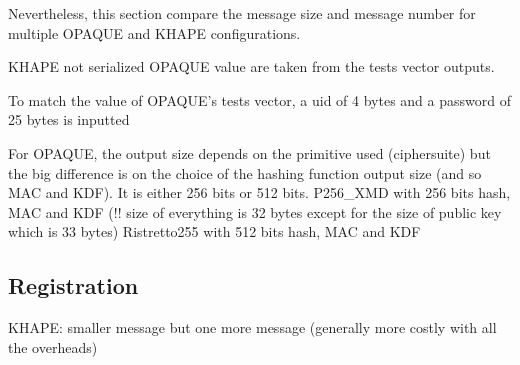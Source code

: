 \documentclass[../report.tex]{subfiles}
\begin{document}
Nevertheless, this section compare the message size and message number for multiple OPAQUE and KHAPE configurations.

KHAPE not serialized
OPAQUE value are taken from the tests vector outputs.

To match the value of OPAQUE's tests vector, a uid of 4 bytes and a password of 25 bytes is inputted


For OPAQUE, the output size depends on the primitive used (ciphersuite) but the big difference is on the choice of the hashing function output size (and so MAC and KDF). It is either 256 bits or 512 bits.
P256\_XMD with 256 bits hash, MAC and KDF (!! size of everything is 32 bytes except for the size of public key which is 33 bytes)
Ristretto255 with 512 bits hash, MAC and KDF


% 
% 



\pgfplotsset{width=\textwidth-2.4cm}


\subsection*{Registration}

KHAPE: smaller message but one more message (generally more costly with all the overheads)

\end{document}
